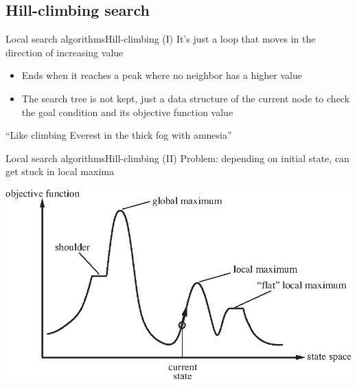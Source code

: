 \documentclass[10pt,compress]{beamer} %
\begin{document}
\subsection{Hill-climbing search}

\begin{frame}{Local search algorithms}{Hill-climbing (I)}
    It's just a loop that moves in the direction of increasing value
        \begin{itemize}
        \item Ends when it reaches a peak where no neighbor has a higher value
        \item The search tree is not kept, just a data structure of the current node to check the goal condition and its objective function value
        \end{itemize}
   ``Like climbing Everest in the thick fog with amnesia''
\end{frame}

\begin{frame}{Local search algorithms}{Hill-climbing (II)}
    Problem: depending on initial state, can get stuck in local maxima
	    \begin{center}
		\includegraphics[width=0.75\linewidth]{figs/hill-climbing.eps}
	    \end{center}
\end{frame}
\end{document}
